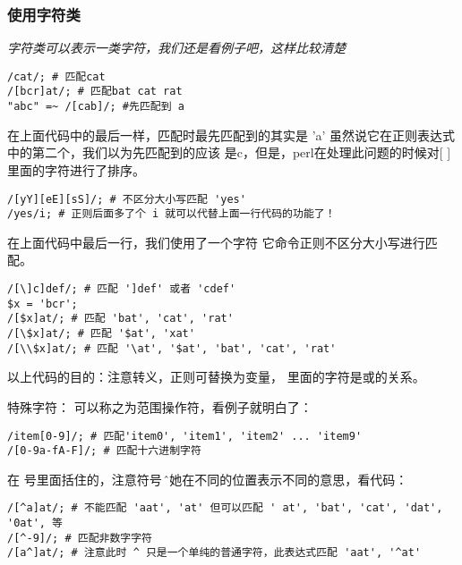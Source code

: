 \documentclass{article}
\begin{document}
\subsubsection{使用字符类}
\textit{
字符类可以表示一类字符，我们还是看例子吧，这样比较清楚
}

\begin{verbatim}
/cat/; # 匹配cat
/[bcr]at/; # 匹配bat cat rat
"abc" =~ /[cab]/; #先匹配到 a
\end{verbatim}

在上面代码中的最后一样，匹配时最先匹配到的其实是 'a' 虽然说它在正则表达式中的第二个，我们以为先匹配到的应该
是c，但是，perl在处理此问题的时候对[ ]里面的字符进行了排序。

\begin{verbatim}
/[yY][eE][sS]/; # 不区分大小写匹配 'yes'
/yes/i; # 正则后面多了个 i 就可以代替上面一行代码的功能了！
\end{verbatim}

在上面代码中最后一行，我们使用了一个字符 它命令正则不区分大小写进行匹配。


\begin{verbatim}
/[\]c]def/; # 匹配 ']def' 或者 'cdef'
$x = 'bcr';
/[$x]at/; # 匹配 'bat', 'cat', 'rat'
/[\$x]at/; # 匹配 '$at', 'xat'
/[\\$x]at/; # 匹配 '\at', '$at', 'bat', 'cat', 'rat'
\end{verbatim}

以上代码的目的：注意转义，正则可替换为变量，\code{{\color{blue}[]}} 里面的字符是或的关系。

特殊字符：\code{{\color{blue}-}} 可以称之为范围操作符，看例子就明白了：

\begin{verbatim}
/item[0-9]/; # 匹配'item0', 'item1', 'item2' ... 'item9'
/[0-9a-fA-F]/; # 匹配十六进制字符
\end{verbatim}

在 \code{{\color{blue}[]}} 号里面括住的，注意符号 \^ ，她在不同的位置表示不同的意思，看代码：

\begin{verbatim}
/[^a]at/; # 不能匹配 'aat', 'at' 但可以匹配 ' at', 'bat', 'cat', 'dat', '0at', 等
/[^-9]/; # 匹配非数字字符
/[a^]at/; # 注意此时 ^ 只是一个单纯的普通字符，此表达式匹配 'aat', '^at'
\end{verbatim}
\end{document}
